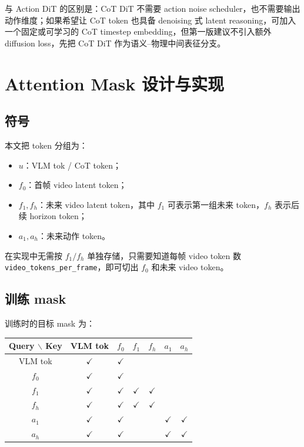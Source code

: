 \documentclass[UTF8,a4paper,11pt]{ctexart}
\newcommand{\yes}{\ensuremath{\checkmark}}
\begin{document}
与 Action DiT 的区别是：CoT DiT 不需要 action noise scheduler，也不需要输出动作维度；如果希望让 CoT token 也具备 denoising 式 latent reasoning，可加入一个固定或可学习的 CoT timestep embedding，但第一版建议不引入额外 diffusion loss，先把 CoT DiT 作为语义--物理中间表征分支。

\section{Attention Mask 设计与实现}

\subsection{符号}

本文把 token 分组为：
\begin{itemize}[leftmargin=1.6em]
  \item $u$：VLM tok / CoT token；
  \item $f_0$：首帧 video latent token；
  \item $f_1, f_h$：未来 video latent token，其中 $f_1$ 可表示第一组未来 token，$f_h$ 表示后续 horizon token；
  \item $a_1, a_h$：未来动作 token。
\end{itemize}

在实现中无需按 $f_1/f_h$ 单独存储，只需要知道每帧 video token 数 \texttt{video\_tokens\_per\_frame}，即可切出 $f_0$ 和未来 video token。

\subsection{训练 mask}

训练时的目标 mask 为：

\begin{center}
\begin{tabular}{c|cccccc}
\toprule
Query $\backslash$ Key & VLM tok & $f_0$ & $f_1$ & $f_h$ & $a_1$ & $a_h$ \\
\midrule
VLM tok & \yes & \yes & & & & \\
$f_0$   & \yes & \yes & & & & \\
$f_1$   & \yes & \yes & \yes & \yes & & \\
$f_h$   & \yes & \yes & \yes & \yes & & \\
$a_1$   & \yes & \yes & & & \yes & \yes \\
$a_h$   & \yes & \yes & & & \yes & \yes \\
\bottomrule
\end{tabular}
\end{center}
\end{document}

